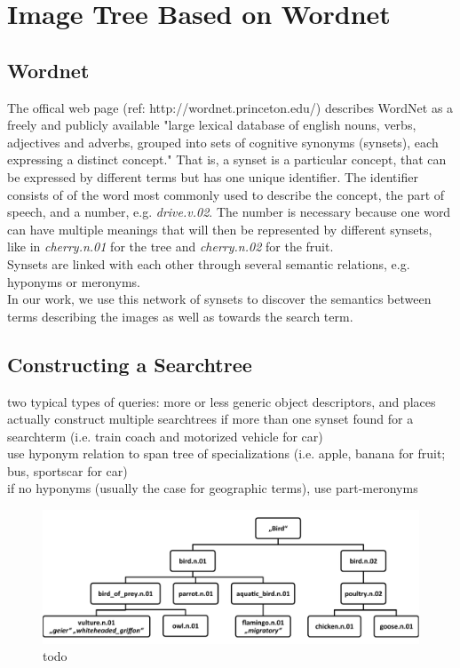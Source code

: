 %
\section{Image Tree Based on Wordnet}
\label{sec_wordnetsearchtree}

\subsection{Wordnet}
The offical web page (ref: http://wordnet.princeton.edu/) describes WordNet as a freely and publicly available "large lexical database of english nouns, verbs, adjectives and adverbs, grouped into sets of cognitive synonyms (synsets), each expressing a distinct concept." That is, a synset is a particular concept, that can be expressed by different terms but has one unique identifier. The identifier consists of of the word most commonly used to describe the concept, the part of speech, and a number, e.g. \emph{drive.v.02}.
The number is necessary because one word can have multiple meanings that will then be represented by different synsets, like in \emph{cherry.n.01} for the tree and \emph{cherry.n.02} for the fruit. \\

Synsets are linked with each other through several semantic relations, e.g. hyponyms or meronyms. \\
In our work, we use this network of synsets to discover the semantics between terms describing the images as well as towards the search term. \\
  

\subsection{Constructing a Searchtree}
two typical types of queries: more or less generic object descriptors, and places \\
actually construct multiple searchtrees if more than one synset found for a searchterm (i.e. train coach and motorized vehicle for car)\\
use hyponym relation to span tree of specializations (i.e. apple, banana for fruit; bus, sportscar for car)\\
if no hyponyms (usually the case for geographic terms), use part-meronyms\\

\begin{figure}
\includegraphics[width=\textwidth]{images/searchtree.pdf}
\caption{todo}
\label{fig_searchtree}
\end{figure}

